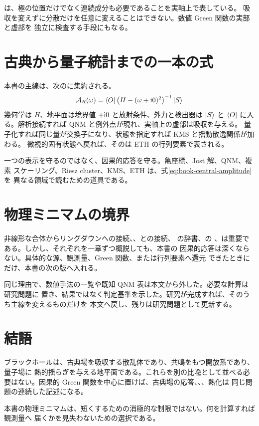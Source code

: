 は、極の位置だけでなく連続成分も必要であることを実軸上で表している。
吸収を変えずに分散だけを任意に変えることはできない。数値 Green 関数の実部と虚部を
独立に検査する手段にもなる。

\section{古典から量子統計までの一本の式}

本書の主線は、次のに集約される。
\begin{equation}
\mathcal{A}_R(\omega)
=
\langle O \rvert
\left(
H-(\omega+\mathrm{i}0)^2
\right)^{-1}
\lvert S \rangle
\label{eq:book-central-amplitude}
\end{equation}
幾何学は $H$、地平面は境界値 $+\mathrm{i}0$ と放射条件、外力と検出器は $\lvert S \rangle$ と
$\langle O \rvert$ に入る。解析接続すれば QNM と例外点が現れ、実軸上の虚部は吸収を与える。
量子化すれば同じ量が交換子になり、状態を指定すれば KMS と揺動散逸関係が加わる。
微視的固有状態へ戻れば、そのは ETH の行列要素で表される。

\begin{principlebox}
一つの表示を守るのではなく、因果的応答を守る。亀座標、Jost 解、QNM、複素
スケーリング、Riesz cluster、KMS、ETH は、式\eqref{eq:book-central-amplitude}を
異なる領域で読むための道具である。
\end{principlebox}

\newpage
\section{物理ミニマムの境界}

非線形な合体からリングダウンへの接続、、との接続、 の辞書、の
、は重要である。しかし、それぞれを一章ずつ概説しても、本書の
因果的応答は深くならない。具体的な源、観測量、Green 関数、または行列要素へ還元
できたときにだけ、本書の次の版へ入れる。

同じ理由で、数値手法の一覧や既知 QNM 表は本文から外した。必要な計算は研究問題に
置き、結果ではなく判定基準を示した。研究が完成すれば、そのうち主線を変えるものだけを
本文へ戻し、残りは研究問題として更新する。

\section{結語}

ブラックホールは、古典場を吸収する散乱体であり、共鳴をもつ開放系であり、量子場に
熱的揺らぎを与える地平面である。これらを別の比喩として並べる必要はない。因果的
Green 関数を中心に置けば、古典場の応答、、、熱化は
同じ問題の連続した記述になる。

本書の物理ミニマムは、短くするための消極的な制限ではない。何を計算すれば観測量へ
届くかを見失わないための選択である。

